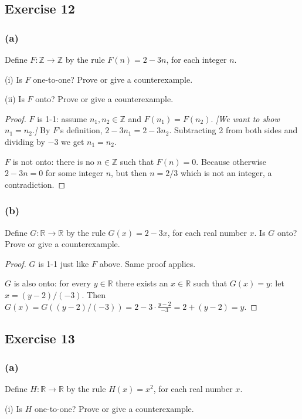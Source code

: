 \documentclass[14pt]{extarticle}
\newcommand{\dps}{\displaystyle}
\newcommand{\R}{\mathbb{R}}
\newcommand{\Z}{\mathbb{Z}}
\begin{document}
\subsection{Exercise 12}
\subsubsection{(a)}
Define \(F: \Z \to \Z\) by the rule \(F(n) = 2 - 3n\), for each integer $n$.

(i) Is $F$ one-to-one? Prove or give a counterexample.

(ii) Is $F$ onto? Prove or give a counterexample.

\begin{proof}
$F$ is 1-1: assume \(n_1, n_2 \in \Z\) and \(F(n_1) = F(n_2)\). {\it [We want to show \(n_1 = n_2\).]} By $F$'s
definition, \(2 - 3n_1 = 2-3n_2\). Subtracting 2 from both sides and dividing by $-3$ we get \(n_1 = n_2\).

$F$ is not onto: there is no \(n \in \Z\) such that \(F(n) = 0\). Because otherwise \(2 - 3n = 0\) for some integer 
$n$, but then \(n = 2/3\) which is not an integer, a contradiction.
\end{proof}

\subsubsection{(b)}
Define \(G: \R \to \R\) by the rule \(G(x) = 2 - 3x\), for each real number $x$. Is $G$ onto? Prove or give a counterexample.

\begin{proof}
$G$ is 1-1 just like $F$ above. Same proof applies.

$G$ is also onto: for every $y \in \R$ there exists an $x \in \R$ such that $G(x) = y$: let \(x = (y - 2) / (-3)\).
Then \(\dps G(x) = G((y - 2) / (-3)) = 2 - 3 \cdot \frac{y-2}{-3} = 2 + (y-2) = y\).
\end{proof}

\subsection{Exercise 13}
\subsubsection{(a)}
Define \(H: \R \to \R\) by the rule \(H(x) = x^2\), for each real number $x$.

(i) Is $H$ one-to-one? Prove or give a counterexample.
\end{document}
